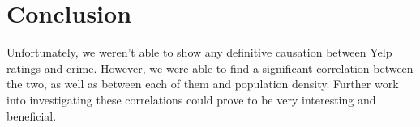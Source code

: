\documentclass{article}
\begin{document}
\section{Conclusion}

Unfortunately, we weren't able to show any definitive causation between
Yelp ratings and crime. However, we were able to find a significant
correlation between the two, as well as between each of them and population
density. Further work into investigating these correlations could prove to
be very interesting and beneficial.



\end{document}
